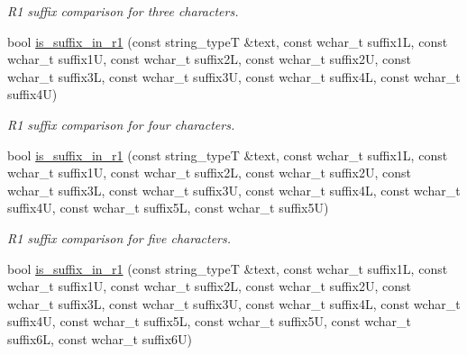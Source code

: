 \begin{DoxyCompactItemize}
\begin{DoxyCompactList}\small\item\em R1 suffix comparison for three characters. \end{DoxyCompactList}\item 
\hypertarget{classstemming_1_1stem_a3fef2f8916933fa1965928f8e43a1b58}{bool \hyperlink{classstemming_1_1stem_a3fef2f8916933fa1965928f8e43a1b58}{is\+\_\+suffix\+\_\+in\+\_\+r1} (const string\+\_\+type\+T \&text, const wchar\+\_\+t suffix1\+L, const wchar\+\_\+t suffix1\+U, const wchar\+\_\+t suffix2\+L, const wchar\+\_\+t suffix2\+U, const wchar\+\_\+t suffix3\+L, const wchar\+\_\+t suffix3\+U, const wchar\+\_\+t suffix4\+L, const wchar\+\_\+t suffix4\+U)}\label{classstemming_1_1stem_a3fef2f8916933fa1965928f8e43a1b58}

\begin{DoxyCompactList}\small\item\em R1 suffix comparison for four characters. \end{DoxyCompactList}\item 
\hypertarget{classstemming_1_1stem_a88f0e5e0cc055f013b6321215eb18ef3}{bool \hyperlink{classstemming_1_1stem_a88f0e5e0cc055f013b6321215eb18ef3}{is\+\_\+suffix\+\_\+in\+\_\+r1} (const string\+\_\+type\+T \&text, const wchar\+\_\+t suffix1\+L, const wchar\+\_\+t suffix1\+U, const wchar\+\_\+t suffix2\+L, const wchar\+\_\+t suffix2\+U, const wchar\+\_\+t suffix3\+L, const wchar\+\_\+t suffix3\+U, const wchar\+\_\+t suffix4\+L, const wchar\+\_\+t suffix4\+U, const wchar\+\_\+t suffix5\+L, const wchar\+\_\+t suffix5\+U)}\label{classstemming_1_1stem_a88f0e5e0cc055f013b6321215eb18ef3}

\begin{DoxyCompactList}\small\item\em R1 suffix comparison for five characters. \end{DoxyCompactList}\item 
\hypertarget{classstemming_1_1stem_a19c2ee5166c7a9c81160408438c1f9a0}{bool \hyperlink{classstemming_1_1stem_a19c2ee5166c7a9c81160408438c1f9a0}{is\+\_\+suffix\+\_\+in\+\_\+r1} (const string\+\_\+type\+T \&text, const wchar\+\_\+t suffix1\+L, const wchar\+\_\+t suffix1\+U, const wchar\+\_\+t suffix2\+L, const wchar\+\_\+t suffix2\+U, const wchar\+\_\+t suffix3\+L, const wchar\+\_\+t suffix3\+U, const wchar\+\_\+t suffix4\+L, const wchar\+\_\+t suffix4\+U, const wchar\+\_\+t suffix5\+L, const wchar\+\_\+t suffix5\+U, const wchar\+\_\+t suffix6\+L, const wchar\+\_\+t suffix6\+U)}\label{classstemming_1_1stem_a19c2ee5166c7a9c81160408438c1f9a0}


\end{DoxyCompactItemize}
